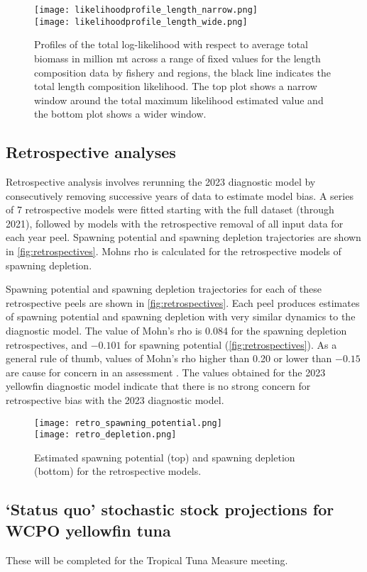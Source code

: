 \begin{figure}[H]
  \centering
  \texttt{[image: likelihoodprofile\_length\_narrow.png]}\\[10mm]
  \texttt{[image: likelihoodprofile\_length\_wide.png]}
  \caption{Profiles of the total log-likelihood with respect to average total biomass in million mt across a range of fixed values for the length composition data by fishery and regions, the black line indicates the total length composition likelihood. The top plot shows a narrow window around the total maximum likelihood estimated value and the bottom plot shows a wider window. \label{fig:likelihood_profile_length}}
\end{figure}

\clearpage

\subsection{Retrospective analyses}
\label{sec:retro_analysis}

Retrospective analysis involves rerunning the 2023 diagnostic model by consecutively removing successive years of data to estimate model bias. A series of 7 retrospective models were fitted starting with the full dataset (through 2021), followed by models with the retrospective removal of all input data for each year peel. Spawning potential and spawning depletion trajectories are shown in \autoref{fig:retrospectives}. Mohns rho is calculated for the retrospective models of spawning depletion.

Spawning potential and spawning depletion trajectories for each of these retrospective peels are shown in \autoref{fig:retrospectives}. Each peel produces estimates of spawning potential and spawning depletion with very similar dynamics to the diagnostic model. The value of Mohn's rho is 0.084 for the spawning depletion retrospectives, and $-0.101$ for spawning potential (\autoref{fig:retrospectives}). As a general rule of thumb, values of Mohn’s rho higher than 0.20 or lower than $-0.15$ are cause for concern in an assessment \citep{hurtado-ferro_looking_2015}. The values obtained for the 2023 yellowfin diagnostic model indicate that there is no strong concern for retrospective bias with the 2023 diagnostic model.

\begin{figure}[H]
  \centering
  \texttt{[image: retro\_spawning\_potential.png]}\\[10mm]
  \texttt{[image: retro\_depletion.png]}
  \caption{Estimated spawning potential (top) and spawning depletion (bottom) for the retrospective models. \label{fig:retrospectives}}
\end{figure}

\clearpage

\subsection{‘Status quo’ stochastic stock projections for WCPO yellowfin tuna}
\label{sec:projections}

These will be completed for the Tropical Tuna Measure meeting.

\newpage
\clearpage
\clearpage
